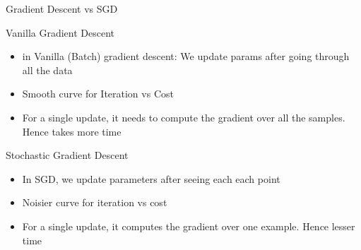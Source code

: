 \documentclass{beamer}
\begin{document}
	
	\begin{frame}{Gradient Descent vs SGD}

	
	
	
	Vanilla Gradient Descent
	\begin{itemize}[<+->]
		\item 
		in Vanilla (Batch) gradient descent: We update params after going through all the data 
		\item Smooth curve for Iteration vs Cost
		\item For a single update, it needs to compute the gradient over all the samples. Hence takes more time
		
	\end{itemize}
	
	Stochastic Gradient Descent
	\begin{itemize}[<+->]
		\item In SGD, we update parameters after seeing each each point
		\item Noisier curve for iteration vs cost 
		\item  For a single update, it computes the gradient over one example. Hence lesser time
	\end{itemize}
	
	
\end{frame}

	
	
	
	
\end{document}
